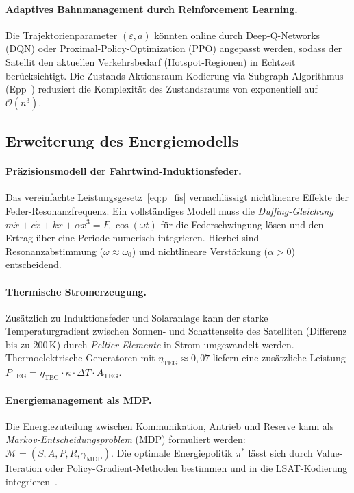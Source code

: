 ﻿\documentclass[a4paper,12pt]{article}
\theoremstyle{definition}
\begin{document}
\paragraph{Adaptives Bahnmanagement durch Reinforcement Learning.}
Die Trajektorienparameter $(\varepsilon, a)$ k\"onnten online durch
Deep-Q-Networks (DQN) oder Proximal-Policy-Optimization (PPO)
angepasst werden, sodass der Satellit den aktuellen Verkehrsbedarf
(Hotspot-Regionen) in Echtzeit ber\"ucksichtigt.
Die Zustands-Aktionsraum-Kodierung via Subgraph Algorithmus (Epp~\cite{Epp2026})
reduziert die Komplexit\"at des Zustandsraums von exponentiell auf $\mathcal{O}(n^3)$.

\subsection{Erweiterung des Energiemodells}

\paragraph{Pr\"azisionsmodell der Fahrtwind-Induktionsfeder.}
Das vereinfachte Leistungsgesetz~\eqref{eq:p_fis} vernachl\"assigt
nichtlineare Effekte der Feder-Resonanzfrequenz.
Ein vollst\"andiges Modell muss die
\emph{Duffing-Gleichung}
$m\ddot{x} + c\dot{x} + kx + \alpha x^3 = F_0\cos(\omega t)$
f\"ur die Federschwingung l\"osen und den Ertrag \"uber eine Periode
numerisch integrieren.
Hierbei sind Resonanzabstimmung ($\omega \approx \omega_0$)
und nichtlineare Verst\"arkung ($\alpha > 0$) entscheidend.

\paragraph{Thermische Stromerzeugung.}
Zus\"atzlich zu Induktionsfeder und Solaranlage kann der starke
Temperaturgradient zwischen Sonnen- und Schattenseite des Satelliten
(Differenz bis zu $200$\,K) durch \emph{Peltier-Elemente} in Strom
umgewandelt werden. Thermoelektrische Generatoren mit $\eta_{\mathrm{TEG}} \approx 0{,}07$
liefern eine zus\"atzliche Leistung
$P_{\mathrm{TEG}} = \eta_{\mathrm{TEG}} \cdot \kappa \cdot \Delta T \cdot A_{\mathrm{TEG}}$.

\paragraph{Energiemanagement als MDP.}
Die Energiezuteilung zwischen Kommunikation, Antrieb und Reserve
kann als \emph{Markov-Entscheidungsproblem} (MDP) formuliert werden:
$\mathcal{M} = (S, A, P, R, \gamma_{\mathrm{MDP}})$.
Die optimale Energiepolitik $\pi^*$ l\"asst sich durch Value-Iteration
oder Policy-Gradient-Methoden bestimmen und in die LSAT-Kodierung
integrieren~\cite{Epp2026lsat}.
\end{document}
